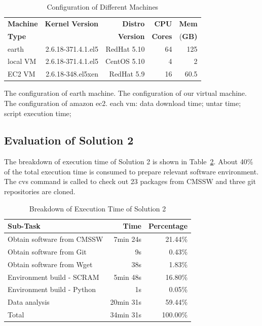 \documentclass{sig-alternate}
\begin{document}
\begin{table}
    \centering
    \begin{tabular}{|l|r|r|r|r|}
    \hline
    \bf Machine & \bf Kernel Version & \bf Distro & \bf CPU & \bf Mem\\ 
    \bf Type &  & \bf Version & \bf Cores & (\bf GB)\\ \hline
    earth  & 2.6.18-371.4.1.el5 & RedHat 5.10 & 64 & 125 \\ \hline 
    local VM& 2.6.18-371.4.1.el5 & CentOS 5.10 & 4 & 2 \\ \hline
    EC2 VM& 2.6.18-348.el5xen & RedHat 5.9 & 16 & 60.5 \\ \hline
    \end{tabular}
    \caption{Configuration of Different Machines}
    \label{table:config-vm}
\end{table}



The configuration of earth machine. The configuration of our virtual machine. The configuration of amazon ec2.
each vm: data download time; untar time; script execution time;

\subsection{Evaluation of Solution 2}
The breakdown of execution time of Solution 2 is shown in Table~\ref{table:time-2nd}. About 40\%  of the total execution time is consumed to prepare relevant software environment. The cvs command is called to check out 23 packages from CMSSW and three git repositories are cloned.

\begin{table}
    \centering
    \begin{tabular}{|l|r|r|}
    \hline
    \bf Sub-Task & \bf Time & \bf Percentage \\ \hline
    Obtain software from CMSSW & 7min 24s & 21.44\% \\ \hline
    Obtain software from Git & 9s & 0.43\% \\ \hline
    Obtain software from Wget & 38s & 1.83\% \\ \hline
    Environment build - SCRAM & 5min 48s & 16.80\% \\ \hline
    Environment build - Python & 1s & 0.05\% \\ \hline
    Data analysis & 20min 31s & 59.44\% \\ \hline
    Total & 34min 31s & 100.00\% \\ \hline
    \end{tabular}
    \caption{Breakdown of Execution Time of Solution 2}
    \label{table:time-2nd}
\end{table}
\end{document}
